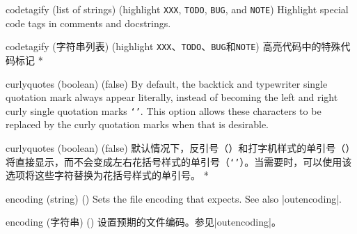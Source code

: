 \begin{optionlist}
\begin{paracol}{2}
\item[codetagify (list of strings) (\textrm{highlight \texttt{XXX}, \texttt{TODO}, \texttt{BUG}, and \texttt{NOTE}})]
Highlight special code tags in comments and docstrings.
\switchcolumn
\item[codetagify (字符串列表) (\textrm{highlight \texttt{XXX}、\texttt{TODO}、\texttt{BUG}和\texttt{NOTE}})]
高亮代码中的特殊代码标记
\switchcolumn[0]*%
\item[curlyquotes (boolean) (false)]
By default, the backtick \texttt{\textasciigrave} and typewriter single quotation mark \texttt{\textquotesingle} always appear literally, instead of becoming the left and right curly single quotation marks \texttt{`'}.  This option allows these characters to be replaced by the curly quotation marks when that is desirable.
\switchcolumn
\item[curlyquotes (boolean) (false)]
默认情况下，反引号（\texttt{\textasciigrave}）和打字机样式的单引号（\texttt{\textquotesingle}）将直接显示，而不会变成左右花括号样式的单引号（\texttt{`'}）。当需要时，可以使用该选项将这些字符替换为花括号样式的单引号。
\switchcolumn[0]*%
\item[encoding (string) (\meta{system-specific})]
Sets the file encoding that  expects.  See also |outencoding|.
\switchcolumn
\item[encoding (字符串) (\meta{系统特定})]
设置预期的文件编码。参见|outencoding|。


\end{paracol}
\end{optionlist}